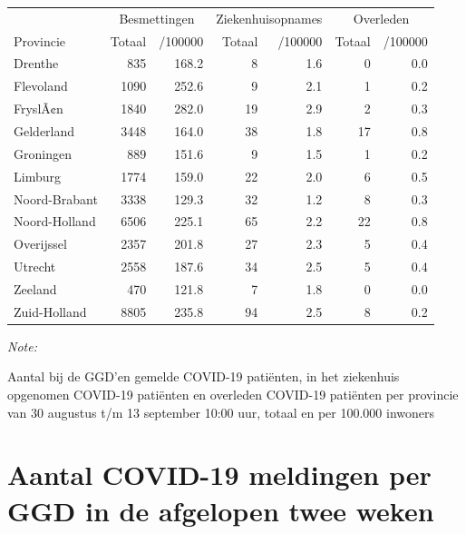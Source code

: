 \documentclass[
  english,
  man,floatsintext]{apa6}
\begin{document}
\begin{table}
\centering
\begin{threeparttable}
\begin{tabular}{lrrrrrr}
\toprule
\multicolumn{1}{c}{ } & \multicolumn{2}{c}{Besmettingen} & \multicolumn{2}{c}{Ziekenhuisopnames} & \multicolumn{2}{c}{Overleden} \\
\cmidrule(l{3pt}r{3pt}){2-3} \cmidrule(l{3pt}r{3pt}){4-5} \cmidrule(l{3pt}r{3pt}){6-7}
Provincie & Totaal & /100000 & Totaal & /100000 & Totaal & /100000\\
\midrule
Drenthe & 835 & 168.2 & 8 & 1.6 & 0 & 0.0\\
Flevoland & 1090 & 252.6 & 9 & 2.1 & 1 & 0.2\\
FryslÃ¢n & 1840 & 282.0 & 19 & 2.9 & 2 & 0.3\\
Gelderland & 3448 & 164.0 & 38 & 1.8 & 17 & 0.8\\
Groningen & 889 & 151.6 & 9 & 1.5 & 1 & 0.2\\
Limburg & 1774 & 159.0 & 22 & 2.0 & 6 & 0.5\\
Noord-Brabant & 3338 & 129.3 & 32 & 1.2 & 8 & 0.3\\
Noord-Holland & 6506 & 225.1 & 65 & 2.2 & 22 & 0.8\\
Overijssel & 2357 & 201.8 & 27 & 2.3 & 5 & 0.4\\
Utrecht & 2558 & 187.6 & 34 & 2.5 & 5 & 0.4\\
Zeeland & 470 & 121.8 & 7 & 1.8 & 0 & 0.0\\
Zuid-Holland & 8805 & 235.8 & 94 & 2.5 & 8 & 0.2\\
\bottomrule
\end{tabular}
\begin{tablenotes}
\item \textit{Note: } 
\item Aantal bij de GGD’en gemelde COVID-19 patiënten, in het ziekenhuis opgenomen COVID-19 patiënten en overleden COVID-19 patiënten per provincie van 30 augustus t/m 13 september 10:00 uur, totaal en per 100.000 inwoners
\end{tablenotes}
\end{threeparttable}
\end{table}

\newpage

\hypertarget{aantal-covid-19-meldingen-per-ggd-in-de-afgelopen-twee-weken}{%
\section{Aantal COVID-19 meldingen per GGD in de afgelopen twee weken}\label{aantal-covid-19-meldingen-per-ggd-in-de-afgelopen-twee-weken}}
\end{document}
